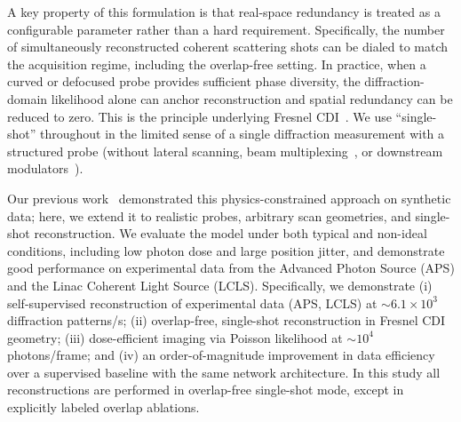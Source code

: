 \documentclass{optica-article}
\begin{document}
A key property of this formulation is that real-space redundancy is treated as a configurable parameter rather than a hard requirement. Specifically, the number of simultaneously reconstructed coherent scattering shots can be dialed to match the acquisition regime, including the overlap-free setting. In practice, when a curved or defocused probe provides sufficient phase diversity, the diffraction-domain likelihood alone can anchor reconstruction and spatial redundancy can be reduced to zero. This is the principle underlying Fresnel CDI~\cite{Williams2006FresnelCDI,Stockmar2013Nearfield}. We use ``single-shot'' throughout in the limited sense of a single diffraction measurement with a structured probe (without lateral scanning, beam multiplexing~\cite{Sidorenko2015Optica,Kharitonov2022SciRep}, or downstream modulators~\cite{Zhang2016CMI,Dong2018CMI}).

Our previous work~\cite{Hoidn2023PtychoPINN} demonstrated this physics-constrained approach on synthetic data; here, we extend it to realistic probes, arbitrary scan geometries, and single-shot reconstruction. We evaluate the model under both typical and non-ideal conditions, including low photon dose and large position jitter, and demonstrate good performance on experimental data from the Advanced Photon Source (APS) and the Linac Coherent Light Source (LCLS). Specifically, we demonstrate (i) self-supervised reconstruction of experimental data (APS, LCLS) at ${\sim}6.1\times10^3$ diffraction patterns/s; (ii) overlap-free, single-shot reconstruction in Fresnel CDI geometry; (iii) dose-efficient imaging via Poisson likelihood at ${\sim}10^4$ photons/frame; and (iv) an order-of-magnitude improvement in data efficiency over a supervised baseline with the same network architecture.
In this study all reconstructions are performed in overlap-free single-shot mode, except in explicitly labeled overlap ablations.
\end{document}
